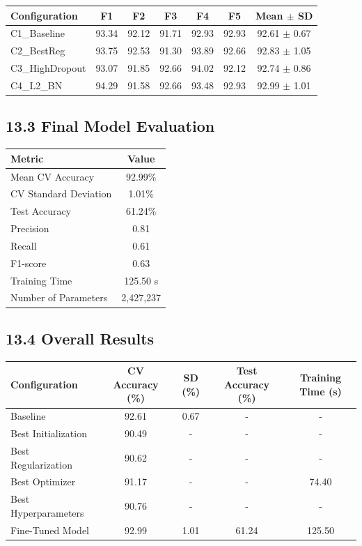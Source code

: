 \documentclass[10pt]{article}
\begin{document}
\begin{table}[H]
\centering
\begin{tabular}{|l|c|c|c|c|c|c|}
\hline
\textbf{Configuration} & \textbf{F1} & \textbf{F2} & \textbf{F3} & \textbf{F4} & \textbf{F5} & \textbf{Mean $\pm$ SD}\\
\hline
C1\_Baseline & 93.34 & 92.12 & 91.71 & 92.93 & 92.93 & 92.61 $\pm$ 0.67 \\
\hline
C2\_BestReg & 93.75 & 92.53 & 91.30 & 93.89 & 92.66 & 92.83 $\pm$ 1.05 \\
\hline
C3\_HighDropout & 93.07 & 91.85 & 92.66 & 94.02 & 92.12 & 92.74 $\pm$ 0.86 \\
\hline
C4\_L2\_BN & 94.29 & 91.58 & 92.66 & 93.48 & 92.93 & 92.99 $\pm$ 1.01 \\
\hline
\end{tabular}
\end{table}

\subsection*{13.3 Final Model Evaluation}

\begin{table}[H]
\centering
\begin{tabular}{|l|c|}
\hline
\textbf{Metric} & \textbf{Value}\\
\hline
Mean CV Accuracy & 92.99\% \\
\hline
CV Standard Deviation & 1.01\% \\
\hline
Test Accuracy & 61.24\% \\
\hline
Precision & 0.81 \\
\hline
Recall & 0.61 \\
\hline
F1-score & 0.63 \\
\hline
Training Time & 125.50 s \\
\hline
Number of Parameters & 2,427,237 \\
\hline
\end{tabular}
\end{table}

\subsection*{13.4 Overall Results}

\begin{table}[H]
\centering
\begin{tabular}{|l|c|c|c|c|}
\hline
\textbf{Configuration} & \textbf{CV Accuracy (\%)} & \textbf{SD (\%)} & \textbf{Test Accuracy (\%)} & \textbf{Training Time (s)}\\
\hline
Baseline & 92.61 & 0.67 & - & - \\
\hline
Best Initialization & 90.49 & - & - & - \\
\hline
Best Regularization & 90.62 & - & - & - \\
\hline
Best Optimizer & 91.17 & - & - & 74.40 \\
\hline
Best Hyperparameters & 90.76 & - & - & - \\
\hline
Fine-Tuned Model & 92.99 & 1.01 & 61.24 & 125.50 \\
\hline
\end{tabular}
\end{table}
\end{document}
